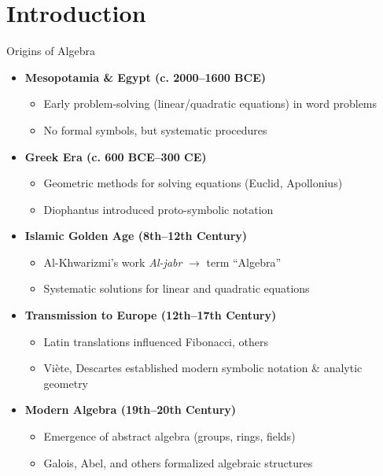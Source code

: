 \section{Introduction}
\begin{frame}{Origins of Algebra}
    \begin{itemize}
      \item \textbf{Mesopotamia \& Egypt (c. 2000–1600 BCE)}
        \begin{itemize}
          \item Early problem-solving (linear/quadratic equations) in word problems
          \item No formal symbols, but systematic procedures
        \end{itemize}
  
      \item \textbf{Greek Era (c. 600 BCE–300 CE)}
        \begin{itemize}
          \item Geometric methods for solving equations (Euclid, Apollonius)
          \item Diophantus introduced proto-symbolic notation
        \end{itemize}
  
      \item \textbf{Islamic Golden Age (8th–12th Century)}
        \begin{itemize}
          \item Al-Khwarizmi’s work \emph{Al-jabr} $\rightarrow$ term “Algebra”
          \item Systematic solutions for linear and quadratic equations
        \end{itemize}
  
      \item \textbf{Transmission to Europe (12th–17th Century)}
        \begin{itemize}
          \item Latin translations influenced Fibonacci, others
          \item Viète, Descartes established modern symbolic notation \& analytic geometry
        \end{itemize}
  
      \item \textbf{Modern Algebra (19th–20th Century)}
        \begin{itemize}
          \item Emergence of abstract algebra (groups, rings, fields)
          \item Galois, Abel, and others formalized algebraic structures
        \end{itemize}
    \end{itemize}
  \end{frame}
